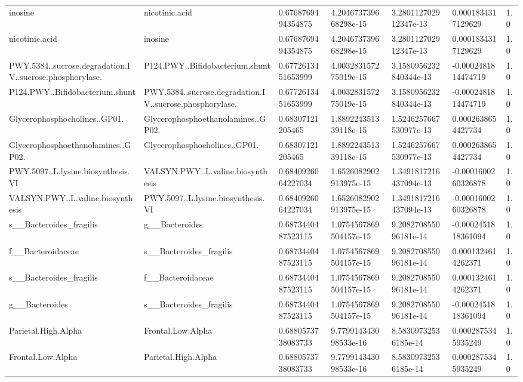 \begin{longtable}{lllllll}
inosine & nicotinic.acid & 0.6768769494354875 & 4.204673739668298e-15 & 3.280112702912347e-13 & 0.0001834317129629 & 1.0 \\
nicotinic.acid & inosine & 0.6768769494354875 & 4.204673739668298e-15 & 3.280112702912347e-13 & 0.0001834317129629 & 1.0 \\
PWY.5384..sucrose.degradation.IV..sucrose.phosphorylase. & P124.PWY..Bifidobacterium.shunt & 0.6772613451653999 & 4.003283157275019e-15 & 3.1580956232840344e-13 & -0.0002481814474719 & 1.0 \\
P124.PWY..Bifidobacterium.shunt & PWY.5384..sucrose.degradation.IV..sucrose.phosphorylase. & 0.6772613451653999 & 4.003283157275019e-15 & 3.1580956232840344e-13 & -0.0002481814474719 & 1.0 \\
Glycerophosphocholines..GP01. & Glycerophosphoethanolamines..GP02. & 0.68307121205465 & 1.889224351339118e-15 & 1.5246257667530977e-13 & 0.0002638654427734 & 1.0 \\
Glycerophosphoethanolamines..GP02. & Glycerophosphocholines..GP01. & 0.68307121205465 & 1.889224351339118e-15 & 1.5246257667530977e-13 & 0.0002638654427734 & 1.0 \\
PWY.5097..L.lysine.biosynthesis.VI & VALSYN.PWY..L.valine.biosynthesis & 0.6840926064227034 & 1.6526082902913975e-15 & 1.3491817216437094e-13 & -0.0001600260326878 & 1.0 \\
VALSYN.PWY..L.valine.biosynthesis & PWY.5097..L.lysine.biosynthesis.VI & 0.6840926064227034 & 1.6526082902913975e-15 & 1.3491817216437094e-13 & -0.0001600260326878 & 1.0 \\
s\_\_Bacteroides\_fragilis & g\_\_Bacteroides & 0.6873440487523115 & 1.0754567869504157e-15 & 9.208270855096181e-14 & -0.0002451818361094 & 1.0 \\
f\_\_Bacteroidaceae & s\_\_Bacteroides\_fragilis & 0.6873440487523115 & 1.0754567869504157e-15 & 9.208270855096181e-14 & 0.0001324614262371 & 1.0 \\
s\_\_Bacteroides\_fragilis & f\_\_Bacteroidaceae & 0.6873440487523115 & 1.0754567869504157e-15 & 9.208270855096181e-14 & 0.0001324614262371 & 1.0 \\
g\_\_Bacteroides & s\_\_Bacteroides\_fragilis & 0.6873440487523115 & 1.0754567869504157e-15 & 9.208270855096181e-14 & -0.0002451818361094 & 1.0 \\
Parietal.High.Alpha & Frontal.Low.Alpha & 0.6880573738083733 & 9.779914343098533e-16 & 8.58309732536185e-14 & 0.0002875345935249 & 1.0 \\
Frontal.Low.Alpha & Parietal.High.Alpha & 0.6880573738083733 & 9.779914343098533e-16 & 8.58309732536185e-14 & 0.0002875345935249 & 1.0 \\

\end{longtable}
